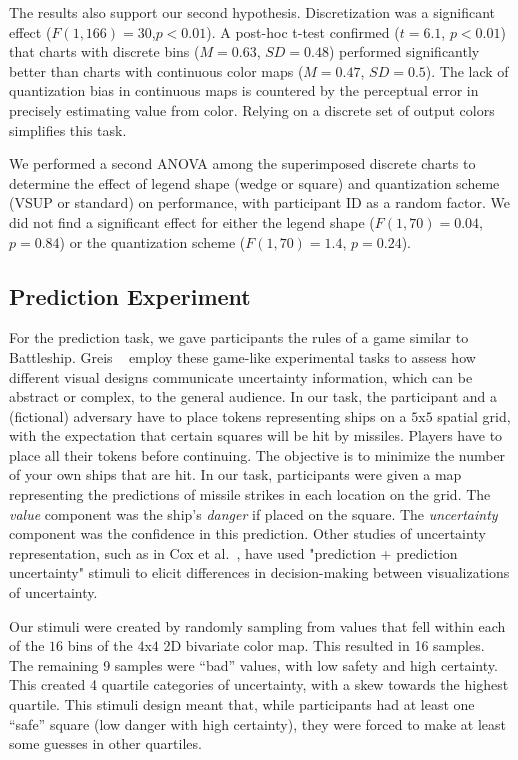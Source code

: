 The results also support our second hypothesis. Discretization was a significant effect ($F(1,166)=30$,$p<0.01$). A post-hoc t-test confirmed ($t=6.1$, $p<0.01$) that charts with discrete bins ($M=0.63$, $SD=0.48$) performed significantly better than charts with continuous color maps ($M=0.47$, $SD=0.5$). The lack of quantization bias in continuous maps is countered by the perceptual error in precisely estimating value from color. Relying on a discrete set of output colors simplifies this task.

We performed a second ANOVA among the superimposed discrete charts to determine the effect of legend shape (wedge or square) and quantization scheme (VSUP or standard) on performance, with participant ID as a random factor. We did not find a significant effect for either the legend shape ($F(1,70)=0.04$, $p=0.84$) or the quantization scheme ($F(1,70)=1.4$, $p=0.24$).

\subsection{Prediction Experiment}

\taskTwoFig

For the prediction task, we gave participants the rules of a game similar to Battleship. Greis \ea~\cite{greis2016decision} employ these game-like experimental tasks to assess how different visual designs communicate uncertainty information, which can be abstract or complex, to the general audience. In our task, the participant and a (fictional) adversary have to place tokens representing ships on a $5$x$5$ spatial grid, with the expectation that certain squares will be hit by missiles. Players have to place all their tokens before continuing. The objective is to minimize the number of your own ships that are hit. In our task, participants were given a map representing the predictions of missile strikes in each location on the grid. The \emph{value} component was the ship's \emph{danger} if placed on the square. The \emph{uncertainty} component was the confidence in this prediction. Other studies of uncertainty representation, such as in Cox et al.~\cite{cox2013visualizing}, have used "prediction + prediction uncertainty" stimuli to elicit differences in decision-making between visualizations of uncertainty.

Our stimuli were created by randomly sampling from values that fell within each of the $16$ bins of the $4$x$4$ 2D bivariate color map. This resulted in 16 samples. The remaining 9 samples were ``bad'' values, with low safety and high certainty. This created 4 quartile categories of uncertainty, with a skew towards the highest quartile. This stimuli design meant that, while participants had at least one ``safe'' square (low danger with high certainty), they were forced to make at least some guesses in other quartiles.

